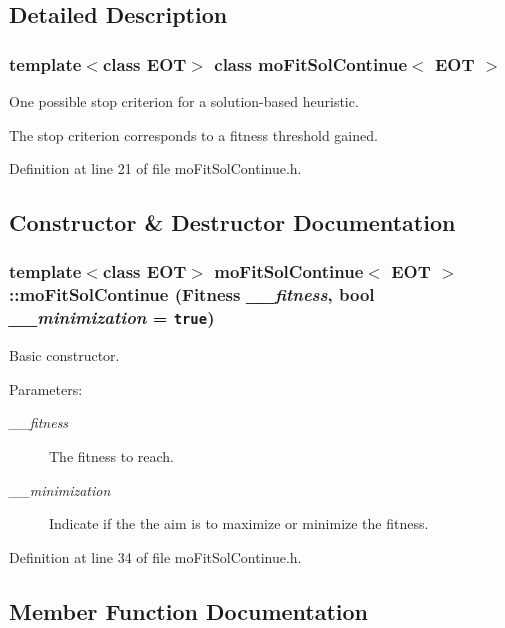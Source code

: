 \subsection{Detailed Description}
\subsubsection*{template$<$class EOT$>$ class moFitSolContinue$<$ EOT $>$}

One possible stop criterion for a solution-based heuristic. 

The stop criterion corresponds to a fitness threshold gained. 



Definition at line 21 of file moFitSolContinue.h.

\subsection{Constructor \& Destructor Documentation}
\subsubsection{\setlength{\rightskip}{0pt plus 5cm}template$<$class EOT$>$ {\bf moFitSolContinue}$<$ EOT $>$::{\bf moFitSolContinue} ({\bf Fitness} {\em \_\-\_\-fitness}, bool {\em \_\-\_\-minimization} = {\tt true})\hspace{0.3cm}{\tt  [inline]}}\label{classmo_fit_sol_continue_667090eca00b8532524f8e0a6e988fed}


Basic constructor. 

\begin{Desc}
\item[Parameters:]
\begin{description}
\item[{\em \_\-\_\-fitness}]The fitness to reach. \item[{\em \_\-\_\-minimization}]Indicate if the the aim is to maximize or minimize the fitness. \end{description}
\end{Desc}


Definition at line 34 of file moFitSolContinue.h.

\subsection{Member Function Documentation}

